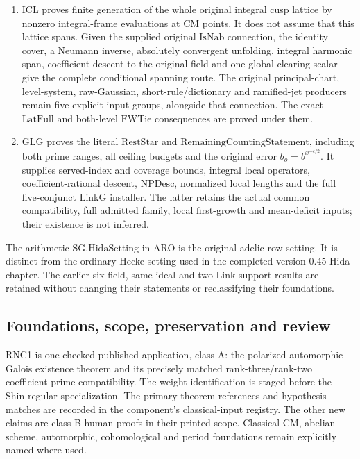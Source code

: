 \documentclass[11pt,a4paper]{article}
\numberwithin{equation}{section}
\theoremstyle{remark}\newtheorem{remark}[theorem]{Remark}
\begin{document}
\begin{enumerate}
\item ICL proves finite generation of the whole original integral cusp
lattice by nonzero integral-frame evaluations at CM points. It does
not assume that this lattice spans. Given the supplied original \(\mathrm{IsNab}\) connection, the
identity cover, a Neumann
inverse, absolutely convergent unfolding, integral harmonic span,
coefficient descent to the original field and one global clearing
scalar give the complete conditional spanning route. The original
principal-chart, level-system, raw-Gaussian, short-rule/dictionary and
ramified-jet producers remain five explicit input groups, alongside that connection. The exact
\(\mathrm{LatFull}\) and both-level \(\mathrm{FWTie}\) consequences
are proved under them.

\item GLG proves the literal \(\mathrm{RestStar}\) and
\(\mathrm{RemainingCountingStatement}\), including both prime
ranges, all ceiling budgets and the original error
\(b_o=b^{x^{-\epsilon/2}}\). It supplies served-index and coverage
bounds, integral local operators, coefficient-rational descent,
\(\mathrm{NPDesc}\), normalized local lengths and the full
five-conjunct \(\mathrm{LinkG}\) installer. The latter retains the
actual common compatibility, full admitted family, local first-growth
and mean-deficit inputs; their existence is not inferred.
\end{enumerate}

The arithmetic \(\mathrm{SG.HidaSetting}\) in ARO is the original
adelic row setting. It is distinct from the ordinary-Hecke setting
used in the completed version-0.45 Hida chapter. The earlier six-field,
same-ideal and two-Link support results are retained without changing
their statements or reclassifying their foundations.

\subsection{Foundations, scope, preservation and review}

RNC1 is one checked published application, class A: the polarized
automorphic Galois existence theorem and its precisely matched
rank-three/rank-two coefficient-prime compatibility. The weight
identification is staged before the Shin-regular specialization.
The primary theorem references and hypothesis matches are recorded
in the component's classical-input registry. The other new claims
are class-B human proofs in their printed scope. Classical CM,
abelian-scheme, automorphic, cohomological and period foundations
remain explicitly named where used.
\end{document}
